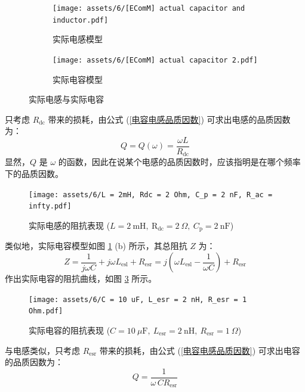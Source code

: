 \documentclass[UTF8]{report}
\def\nF{\ \mathrm{nF}}
\theoremstyle{MyLineTheoremStyle} %
\theoremstyle{MyBlockTheoremStyle} %
\theoremstyle{MySubsubsectionStyle} %
\begin{document}
\begin{figure}[H]\centering
    \begin{subfigure}[b]{0.5\columnwidth}\centering
        \texttt{[image: assets/6/[EComM] actual capacitor and inductor.pdf]}
        \caption{实际电感模型}
    \end{subfigure}\hfill
    \begin{subfigure}[b]{0.5\columnwidth}\centering
        \texttt{[image: assets/6/[EComM] actual capacitor 2.pdf]}
        \caption{实际电容模型}
    \end{subfigure}
    \caption{实际电感与实际电容}
    \label{实际电感与实际电容}
\end{figure}

    只考虑 $R_{\text{dc}}$ 带来的损耗，由公式 (\ref{电容电感品质因数}) 可求出电感的品质因数为：
    \begin{equation}
    Q = Q(\omega) = \frac{\omega L}{R_{\text{dc}}}
    \end{equation}
    显然，$Q$ 是 $\omega$ 的函数，因此在说某个电感的品质因数时，应该指明是在哪个频率下的品质因数。


\begin{figure}[H]\centering
    \texttt{[image: assets/6/L = 2mH, Rdc = 2 Ohm, C\_p = 2 nF, R\_ac = infty.pdf]}
    \caption{实际电感的阻抗表现 ($L = 2\ \mathrm{mH},\ \mathrm{R_{\text{dc}}} = 2 \ \Omega,\ C_\text{p} = 2 \nF$)}
    \label{实际电感的阻抗表现}
\end{figure}


类似地，实际电容模型如图 \ref{实际电感与实际电容} (b) 所示，其总阻抗 $Z$ 为：
\begin{equation}
Z = \frac{1}{j \omega C} + j \omega L_{\text{esl}} + R_{\text{esr}} = j \left( \omega L_\text{esl} - \frac{1}{\omega C} \right) +  R_{\text{esr}}
\end{equation}
作出实际电容的阻抗曲线，如图 \ref{实际电容的阻抗表现} 所示。




\begin{figure}[H]\centering
    \texttt{[image: assets/6/C = 10 uF, L\_esr = 2 nH, R\_esr = 1 Ohm.pdf]}
    \caption{实际电容的阻抗表现 ($C = 10 \ \mu \mathrm{F},\ L_{\text{esr}} = 2 \ \mathrm{nH},\ R_{\text{esr}} = 1 \ \Omega$)}
    \label{实际电容的阻抗表现}
\end{figure}

与电感类似，只考虑 $R_{\text{esr}}$ 带来的损耗，由公式 (\ref{电容电感品质因数}) 可求出电容的品质因数为：
\begin{equation}
Q = \frac{1}{\omega \,C R_{\text{esr}}}
\end{equation}
\end{document}
